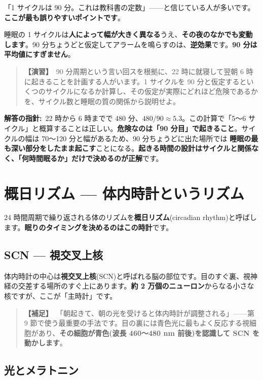 \documentclass{article}
\begin{document}
「1 サイクルは 90 分。これは教科書の定数」——と信じている人が多いです。\textbf{ここが最も誤りやすいポイントです}。

睡眠の 1 サイクルは\textbf{人によって幅が大きく異なる}うえ、\textbf{その夜のなかでも変動します}。90 分ちょうどと仮定してアラームを鳴らすのは、\textbf{逆効果}です。\textbf{90 分は平均値にすぎません}。

\begin{quote}
\textbf{【演習】}\ 90 分周期という言い回スを根拠に、22 時に就寝して翌朝 6 時に起きることを計画する人がいます。1 サイクルを 90 分と仮定するといくつのサイクルになるか計算し、その仮定が実際にどれほど危険であるかを、サイクル数と睡眠の質の関係から説明せよ。
\end{quote}

\textbf{解答の指針:}\ 22 時から 6 時までで 480 分、\(480 / 90 \approx 5.3\)。この計算で「5〜6 サイクル」と概算することは正しい。\textbf{危険なのは「90 分目」で起きること}。サイクルの幅は 70〜120 分と幅があるため、90 分ちょうどに出た場所では \textbf{睡眠の最も深い部分をしたまま起こす}ことになる。\textbf{起きる時間の設計はサイクルと関係なく、「何時間眠るか」だけで決めるのが正解}です。

\section{概日リズム — 体内時計というリズム}

24 時間周期で繰り返される体のリズムを\textbf{概日リズム}(circadian rhythm)と呼ばします。\textbf{眠りのタイミングを決めるのはこの時計}です。

\subsection{SCN — 視交叉上核}

体内時計の中心は\textbf{視交叉上核}(SCN)と呼ばれる脳の部位です。目のすぐ裏、視神経の交差する場所のすぐ上にあります。\textbf{約 2 万個のニューロン}からなる小さな核ですが、ここが「主時計」です。

\begin{quote}
\textbf{【補足】}\ 「朝起きて、朝の光を受けると体内時計が調整される」——第 9 節で使う最重要の手法です。目の裏には青色光に最もよく反応する視細胞があり、\textbf{その細胞が青色(波長 460〜480 nm 前後)を認識して SCN を動かします}。
\end{quote}

\subsection{光とメラトニン}
\end{document}
